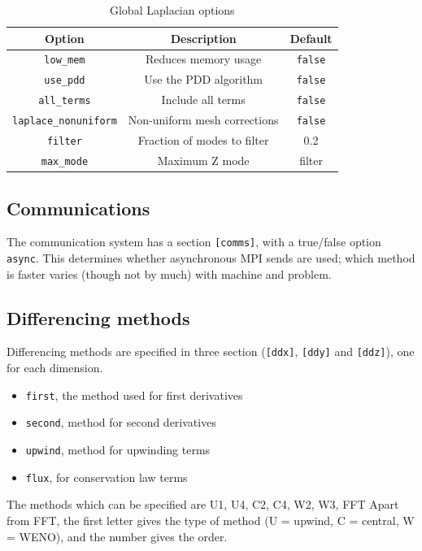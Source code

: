 \documentclass[12pt]{article}
\newcommand{\code}[1]{\texttt{#1}}
\begin{document}
%
\begin{table}[htbp!]
\caption{Global Laplacian options}
%
\label{tab:lapopts}
%
\centering
%
\begin{tabular}[c]{c c c}
\hline
Option & Description & Default \\
\hline
\texttt{low\_mem} & Reduces memory usage & \texttt{false} \\
\texttt{use\_pdd} & Use the PDD algorithm & \texttt{false} \\
\texttt{all\_terms} & Include all terms & \texttt{false} \\
\texttt{laplace\_nonuniform} & Non-uniform mesh corrections & \texttt{false} \\
\texttt{filter} & Fraction of modes to filter & 0.2 \\
\texttt{max\_mode} & Maximum Z mode & filter \\
\hline
\end{tabular}
%
\end{table}
%



\subsection{Communications}
%
%
The communication system has a section \code{[comms]}, with a true/false option
\code{async}. This determines whether asynchronous MPI sends are used; which
method is faster varies (though not by much) with machine and problem.



\subsection{Differencing methods}
%
\label{sec:diffmethodoptions}
%
%
Differencing methods are specified in three section (\code{[ddx]}, \code{[ddy]}
and \code{[ddz]}), one for each dimension.
%
\begin{itemize}
\item \code{first}, the method used for first derivatives
\item \code{second}, method for second derivatives
\item \code{upwind}, method for upwinding terms
\item \code{flux}, for conservation law terms
\end{itemize}
%
The methods which can be specified are U1, U4, C2, C4, W2, W3, FFT Apart from
FFT, the first letter gives the type of method (U = upwind, C = central, W =
WENO), and the number gives the order.
\end{document}
